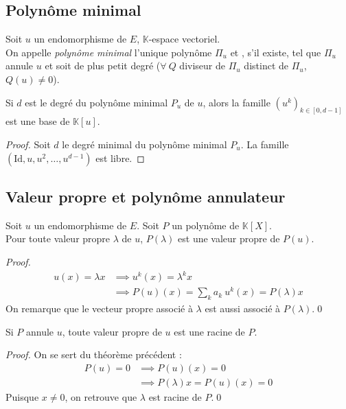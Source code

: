 \documentclass[11pt,a4paper,fleqn,pdftex]{report}
\begin{document}
\subsection{Polynôme minimal}
\begin{dfn}[Polynôme minimal]
Soit $u$ un endomorphisme de $E$, $\mathbb{K}$-espace vectoriel. \\
On appelle \emph{polynôme minimal} l'unique polynôme $\Pi_u$  et , s'il existe, tel que $\Pi_u$ annule $u$ et soit de plus petit degré ($\forall~Q$ diviseur de $\Pi_u$ distinct de $\Pi_u$, $Q(u)\neq 0$).
\end{dfn}
\begin{theorem}%
     Si $d$ est le degré du polynôme minimal $P_u$ de $u$, alors la famille $(u^k)_{k \in \left[ 0 , d-1 \right] }$ est une base de $\mathbb{K} [u]$.
\end{theorem}
\begin{proof}
     Soit $d$ le degré minimal du polynôme minimal $P_u$. La famille $(\mathrm{Id}, u, u^2, \ldots , u^{d-1} )$ est libre. 
\end{proof}
\subsection{Valeur propre et polynôme annulateur} %
\label{sub:valeur_propre_et_polynome_annulateur}
\begin{theorem}
     Soit $u$ un endomorphisme de $E$. Soit $P$ un polynôme de $\mathbb{K} [X]$.\\
     Pour toute valeur propre $\lambda$ de $u$, $P(\lambda)$ est une valeur propre de $P(u)$.
\end{theorem}
\begin{proof}
     \begin{align*}
         u(x) = \lambda x   &\implies u^k(x) = \lambda^k x \\
                            &\implies P(u)(x) = \sum_k a_k~u^k(x) = P(\lambda)x
     \end{align*}
     On remarque que le vecteur propre associé à $\lambda$ est aussi associé à $P(\lambda )$.\qed
\end{proof}
\begin{itheorem}
     Si $P$ annule $u$, toute valeur propre de $u$ est une racine de $P$.
\end{itheorem}
\begin{proof}
     On se sert du théorème précédent : 
     \begin{align*}
          P(u) = 0 &\implies P(u)(x) = 0\\
                   &\implies P(\lambda)x = P(u)(x) = 0
     \end{align*}
     Puisque $x\neq 0$, on retrouve que $\lambda$ est racine de $P$.\qed
\end{proof}
\end{document}
